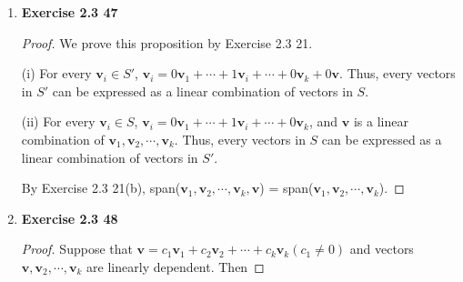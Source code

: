\begin{enumerate}
\begin{proof}
		\noindent Let 
		\begin{align*}
		c_i = \begin{cases}
			d_j &\mbox{if  } i = a_j \\
			0 &\mbox{if  } i \notin \{a_1, a_2, \cdots, a_m \}
		\end{cases}
		\end{align*} then $c_1\textbf{v}_1 + c_2\textbf{v}_2 + \cdots + c_n\textbf{v}_n = d_1\textbf{v}_{a_1} + d_2\textbf{v}_{a_2} + \cdots + d_m\textbf{v}_{a_m} = \textbf{0}$. Therefore, the set $\textbf{v}_1, \textbf{v}_2, \cdots, \textbf{v}_n$ is linearly dependent. The contrapositive proposition that the subset of linearly independent set of vectors is always linearly independent is also true.
	\end{proof}
	\item \textbf{Exercise 2.3 47}
	\begin{proof}
		We prove this proposition by Exercise 2.3 21.
		
		\noindent (i) For every $\textbf{v}_i \in S'$, $\textbf{v}_i = 0\textbf{v}_1 + \cdots + 1\textbf{v}_i + \cdots + 0\textbf{v}_k + 0\textbf{v}$. Thus, every vectors in $S'$ can be expressed as a linear combination of vectors in $S$.
		
		\noindent (ii) For every $\textbf{v}_i \in S$, $\textbf{v}_i = 0\textbf{v}_1 + \cdots + 1\textbf{v}_i + \cdots + 0\textbf{v}_k$, and $\textbf{v}$ is a linear combination of $\textbf{v}_1, \textbf{v}_2, \cdots, \textbf{v}_k$. Thus, every vectors in $S$ can be expressed as a linear combination of vectors in $S'$.
		
		\noindent By Exercise 2.3 21(b), span($\textbf{v}_1, \textbf{v}_2, \cdots, \textbf{v}_k, \textbf{v}$) = span($\textbf{v}_1, \textbf{v}_2, \cdots, \textbf{v}_k$).
	\end{proof}
	\item \textbf{Exercise 2.3 48}
	\begin{proof}
		Suppose that $\textbf{v} = c_1\textbf{v}_1 + c_2\textbf{v}_2 + \cdots + c_k\textbf{v}_k (c_1 \neq 0)$ and vectors $\textbf{v}, \textbf{v}_2, \cdots, \textbf{v}_k$ are linearly dependent. Then 
	\end{proof}
\end{enumerate}